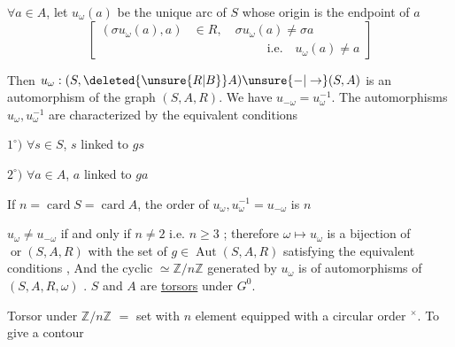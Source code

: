 $\forall a\in A$, let $u_{\omega}(a)$ be the unique arc of $S$ whose origin is the endpoint of $a$
\[
\left[\begin{aligned}
(\sigma u_{\omega}(a),a)&\in R,\quad \sigma u_{\omega}(a)\ne\sigma a\\
&\hspace{6em}\text{i.e.}\quad u_{\omega}(a)\ne a
\end{aligned}\right]
\]

\margin{$\big\}$}Then $u_{\omega}:(S,\deleted{\unsure{R|B}}A)\unsure{-|\to}(S,A)$ is an automorphism of the graph $(S,A,R)$. We have $u_{-\omega}=u_{\omega}^{-1}$. The automorphisms $u_{\omega},u_{\omega}^{-1}$ are characterized by the  equivalent conditions

$1^{\circ})$ $\forall s\in S$, $s$ linked to $gs$

$2^{\circ})$ $\forall a\in A$, $a$ linked to $ga$

If $n=\operatorname{card}S=\operatorname{card}A$, the order of $u_{\omega},u_{\omega}^{-1}=u_{-\omega}$ is $n$

 $u_{\omega}\ne u_{-\omega}$ if and only if $n\ne2$ i.e. $n\geq3$ ; therefore $\omega\longmapsto u_{\omega}$ is a bijection of $\operatorname{or}(S,A,R)$ with the set of $g\in\operatorname{Aut}(S,A,R)$ satisfying the equivalent conditions , And the cyclic  $\simeq\mathbb{Z}/n\mathbb{Z}$ generated by $u_{\omega}$ is    of  automorphisms of $(S,A,R,\omega)$ . $S$ and $A$ are \uline{torsors} under $G^{0}$.


Torsor under $\mathbb{Z}/n\mathbb{Z}$  $=$ set  with $n$ element equipped with a circular order $^{\times}$. To give a contour
